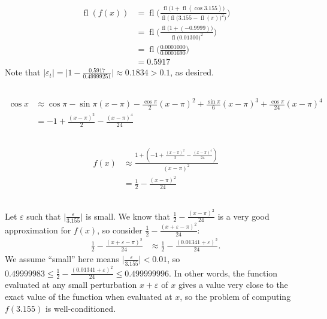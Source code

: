 \documentclass[11pt]{article}
\DeclareMathOperator{\fl}{fl}
\begin{document}
\renewcommand{\thesubsection}{\thesection.\alph{subsection}}
\section{} %
\subsection{} %
\begin{align*}
	\fl(f(x))&=\fl\Biggl(\frac{\fl\bigl(1+\fl(\cos{3.155})\bigr)}{\fl\bigl(\fl\bigl(3.155-\fl(\pi)\bigr)^2\bigr)}\Biggr)\\
	&=\fl\Biggl(\frac{\fl\bigl(1+(-0.9999)\bigr)}{\fl\bigl(0.01300\bigr)^2}\Biggr)\\
	&=\fl\Biggl(\frac{0.0001000}{0.0001690}\Biggr)\\
	&=0.5917
\end{align*}
Note that $\vert\varepsilon_t\vert=\vert1-\frac{0.5917}{0.49999251}\vert\approx0.1834>0.1$,
as desired.


\subsection{} %
\begin{align*}
	\cos x&\approx\cos\pi-\sin\pi(x-\pi)-\frac{\cos\pi}{2}(x-\pi)^2+\frac{\sin\pi}{6}(x-\pi)^3+\frac{\cos\pi}{24}(x-\pi)^4\\
	&=-1+\frac{(x-\pi)^2}{2}-\frac{(x-\pi)^4}{24}
\end{align*}


\subsection{} %
\begin{align*}
	f(x)&\approx\frac{1+(-1+\frac{(x-\pi)^2}{2}-\frac{(x-\pi)^4}{24})}{(x-\pi)^2}\\
	&=\frac{1}{2}-\frac{(x-\pi)^2}{24}
\end{align*}


\subsection{} %
Let $\varepsilon$ such that $\vert\frac{\varepsilon}{3.155}\vert$ is small. We
know that $\frac{1}{2}-\frac{(x-\pi)^2}{24}$ is a very good approximation for
$f(x)$, so consider $\frac{1}{2}-\frac{(x+\varepsilon-\pi)^2}{24}$:
\begin{align*}
	\frac{1}{2}-\frac{(x+\varepsilon-\pi)^2}{24}&\approx
	\frac{1}{2}-\frac{(0.01341+\varepsilon)^2}{24}.
\end{align*}
We assume ``small'' here means $\vert\frac{\varepsilon}{3.155}\vert<0.01$, so
$0.49999983\le\frac{1}{2}-\frac{(0.01341+\varepsilon)^2}{24}\le0.499999996$.
In other words, the function evaluated at any small perturbation
$x+\varepsilon$ of $x$ gives a value very close to the exact value of the
function when evaluated at $x$, so the problem of computing $f(3.155)$ is
well-conditioned.
\end{document}
